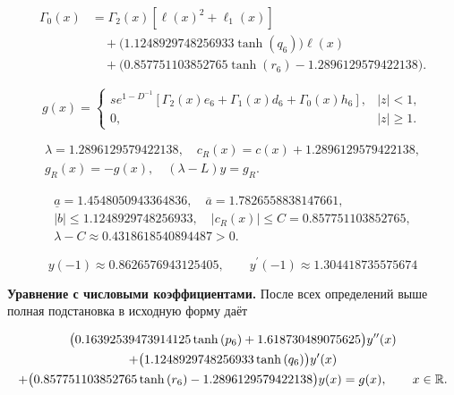 \begin{equation}
\begin{aligned}\Gamma_0(x)&=\Gamma_2(x)[\ell(x)^2+\ell_1(x)]\\&\quad+\bigl(1.1248929748256933 \tanh{\left(q_{6} \right)}\bigr)\ell(x)\\&\quad+\bigl(0.857751103852765 \tanh{\left(r_{6} \right)} - 1.2896129579422138\bigr).\end{aligned}
\end{equation}


\begin{equation}\label{eq:ex3-forcing}
g(x)=\begin{cases}s e^{1-D^{-1}}[\Gamma_2(x)e_{6}+\Gamma_1(x)d_{6}+\Gamma_0(x)h_{6}],&|z|<1,\\0,&|z|\ge1.\end{cases}
\end{equation}


\begin{equation}
\begin{aligned}\lambda=1.2896129579422138,\quad c_R(x)=c(x)+1.2896129579422138,\\g_R(x)=-g(x),\quad (\lambda-L)y=g_R.\end{aligned}
\end{equation}


\begin{equation}
\begin{aligned}\underline a=1.4548050943364836,\quad \overline a=1.7826558838147661,\\|b|\le1.1248929748256933,\quad |c_R(x)|\le C=0.857751103852765,\\\lambda-C\approx0.4318618540894487>0.\end{aligned}
\end{equation}


\begin{equation}
y(-1)\approx0.8626576943125405,\qquad y^\prime(-1)\approx1.304418735575674
\end{equation}


\noindent\textbf{Уравнение с числовыми коэффициентами.} После всех определений выше полная подстановка в исходную форму даёт

\begin{multline}\label{eq:ex3-ode}\bigl(0.16392539473914125 \tanh{\left(p_{6} \right)} + 1.618730489075625\bigr)y^{\prime\prime}(x)\\+\bigl(1.1248929748256933 \tanh{\left(q_{6} \right)}\bigr)y^\prime(x)\\+\bigl(0.857751103852765 \tanh{\left(r_{6} \right)} - 1.2896129579422138\bigr)y(x)=g(x),\qquad x\in\mathbb R.\end{multline}

